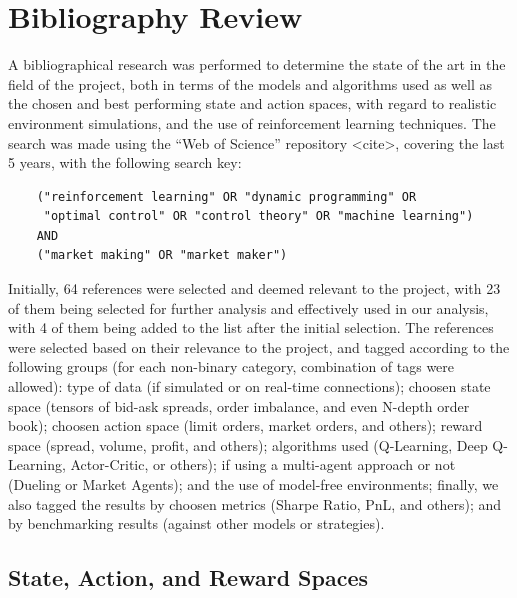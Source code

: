 \section{Bibliography Review}
\label{sec:bibliography-review}

A bibliographical research was performed to determine the state of the art in the field of the project,
both in terms of the models and algorithms used as well as the chosen and best performing state and action spaces,
with regard to realistic environment simulations, and the use of reinforcement learning techniques.
The search was made using the ``Web of Science'' repository <cite>, covering the last 5 years, with the following search key:

\begin{verbatim}
    ("reinforcement learning" OR "dynamic programming" OR
     "optimal control" OR "control theory" OR "machine learning")
    AND
    ("market making" OR "market maker")
\end{verbatim}

Initially, 64 references were selected and deemed relevant to the project,
with 23 of them being selected for further analysis and effectively used in our analysis,
with 4 of them being added to the list after the initial selection.
The references were selected based on their relevance to the project,
and tagged according to the following groups (for each non-binary category, combination of tags were allowed):
type of data (if simulated or on real-time connections);
choosen state space (tensors of bid-ask spreads, order imbalance, and even N-depth order book);
choosen action space (limit orders, market orders, and others);
reward space (spread, volume, profit, and others);
algorithms used (Q-Learning, Deep Q-Learning, Actor-Critic, or others);
if using a multi-agent approach or not (Dueling or Market Agents); and the use of model-free environments;
finally, we also tagged the results by choosen metrics (Sharpe Ratio, PnL, and others);
and by benchmarking results (against other models or strategies).

\subsection{State, Action, and Reward Spaces}


